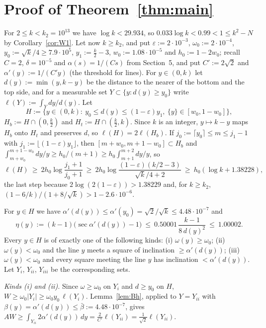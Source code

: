 \documentclass[11pt]{amsart}
\theoremstyle{definition}
\theoremstyle{remark}
\newcommand{\frc}[1]{\{#1\}}
\begin{document}
\section{Proof of Theorem~\ref{thm:main}}

For $2\le k<k_2=10^{13}$ we have $\log k<29.934$, so $0.033\log k<0.99<1\le k^2-N$ by Corollary~\ref{cor:W1}. Let now
$k\ge k_2$, and put $\varepsilon:=2\cdot10^{-3}$, $\omega_0:=2\cdot10^{-4}$, $y_0:=\sqrt k/4\ge7.9\cdot10^5$, $y_1:=\frac k2-3$,
$w_0:=1.08\cdot10^{-5}$ and $h_0:=1-2w_0$; recall $C=2$, $\delta=10^{-5}$ and $\alpha(s)=1/(Cs)$ from Section~5, and put
$C':=2\sqrt2$ and $\alpha'(y):=1/(C'y)$ (the threshold for lines). For $y\in(0,k)$ let $d(y):=\min(y,k-y)$ be the distance to the
nearer of the bottom and the top side, and for a measurable set $Y\subset\{y:d(y)\ge y_0\}$ write $\ell(Y):=\int_Ydy/d(y)$. Let
\[
H:=\{y\in(0,k):\ y_0\le d(y)\le(1-\varepsilon)y_1,\ \frc{y}\in[w_0,1-w_0]\},
\]
$H_b:=H\cap(0,\frac k2)$ and $H_t:=H\cap(\frac k2,k)$.
Since $k$ is an integer, $y\mapsto k-y$ maps $H_b$ onto $H_t$ and preserves $d$, so $\ell(H)=2\ell(H_b)$. If
$j_0:=\lceil y_0\rceil\le m\le j_1-1$ with $j_1:=\lfloor(1-\varepsilon)y_1\rfloor$, then $[m+w_0,m+1-w_0]\subset H_b$ and
$\int_{m+w_0}^{m+1-w_0}dy/y\ge h_0/(m+1)\ge h_0\int_{m+1}^{m+2}dy/y$, so
\[
\ell(H)\ \ge\ 2h_0\log\frac{j_1+1}{j_0+1}\ \ge\ 2h_0\log\frac{(1-\varepsilon)(k/2-3)}{\sqrt k/4+2}\ \ge\ h_0(\log k+1.38228),
\]
the last step because $2\log(2(1-\varepsilon))>1.38229$ and, for $k\ge k_2$, $(1-6/k)/(1+8/\sqrt k)>1-2.6\cdot10^{-6}$.

For $y\in H$ we have $\alpha'(d(y))\le\alpha'(y_0)=\sqrt2/\sqrt k\le4.48\cdot10^{-7}$ and
\[
\eta(y):=(k-1)\big(\sec\alpha'(d(y))-1\big)\ \le\ 0.50001\,\frac{k-1}{8\,d(y)^2}\ \le\ 1.00002 .
\]
Every $y\in H$ is of exactly one of the following kinds: (i) $\omega(y)\ge\omega_0$; (ii) $\omega(y)<\omega_0$ and the line $y$ meets a
square of inclination $\ge\alpha'(d(y))$; (iii) $\omega(y)<\omega_0$ and every square meeting the line $y$ has inclination
$<\alpha'(d(y))$. Let $Y_i$, $Y_{ii}$, $Y_{iii}$ be the corresponding sets.

\smallskip\noindent\emph{Kinds (i) and (ii).} Since $\omega\ge\omega_0$ on $Y_i$ and $d\ge y_0$ on $H$,
$W\ge\omega_0|Y_i|\ge\omega_0y_0\,\ell(Y_i)$. Lemma~\ref{lem:Bh}, applied to $Y=Y_{ii}$ with $\beta(y)=\alpha'(d(y))\le\bar\beta:=4.48\cdot10^{-7}$,
gives $AW\ge\int_{Y_{ii}}2\alpha'(d(y))\,dy=\frac2{C'}\ell(Y_{ii})=\frac1{\sqrt2}\ell(Y_{ii})$.
\end{document}

